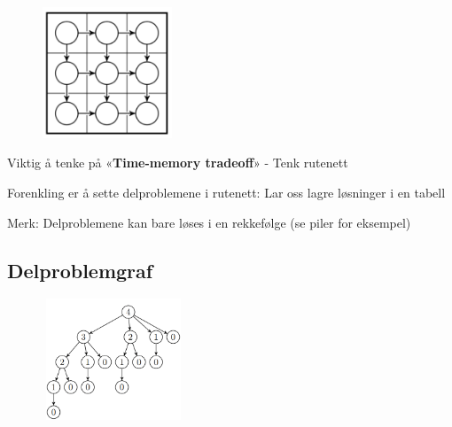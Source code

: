 \documentclass[12pt]{report}
\begin{document}

\begin{figure}[H]
\advance\leftskip 5.28in		\includegraphics[width=1.53in,height=1.54in]{./media/image48.png}
\end{figure}



\par

Viktig å tenke på «\textbf{Time-memory tradeoff}» - Tenk rutenett\par

	\item Forenkling er å sette delproblemene i rutenett: Lar oss lagre løsninger i en tabell\par

	\item Merk: Delproblemene kan bare løses i en rekkefølge (se piler for eksempel)\par

{\fontsize{13pt}{15.6pt}\selectfont  \par}\par


\vspace{\baselineskip}
\subsection*{Delproblemgraf}



\begin{figure}[H]
\advance\leftskip -0.0in		\includegraphics[width=1.67in,height=1.42in]{./media/image49.png}
\end{figure}
\end{document}
